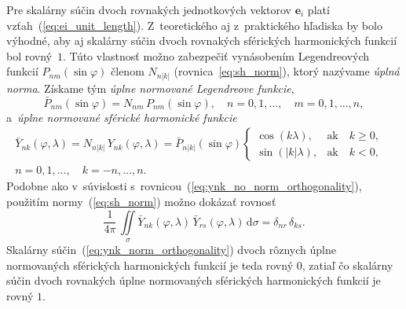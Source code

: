 \documentclass[a4paper,12pt]{book}
\newcommand{\diff}{\mathrm d}
\let\vec\mathbf
\begin{document}
Pre skalárny súčin dvoch rovnakých jednotkových vektorov $\vec e_i$ platí 
vzťah~(\ref{eq:ei_unit_length}).  Z~teoretického aj z~praktického hľadiska by 
bolo výhodné, aby aj skalárny súčin dvoch rovnakých sférických harmonických 
funkcií bol rovný~$1$.  Túto vlastnosť možno zabezpečiť vynásobením 
Legendreových funkcií $P_{nm}(\sin\varphi)$ členom $N_{n|k|}$ 
(rovnica~\ref{eq:sh_norm}), ktorý nazývame \emph{úplná norma}.  Získame tým 
\emph{úplne normované Legendreove funkcie},
%
\begin{equation}
\bar{P}_{nm}(\sin\varphi) = N_{nm} \, P_{nm}(\sin\varphi){,} \quad  n = 0, 1, 
\dots,
\quad m = 0, 1, \dots, n{,}
\end{equation}
%
a~\emph{úplne normované sférické harmonické funkcie}
%
\begin{equation}
\label{eq:ynk_norm}
\begin{split}
\bar{Y}_{nk}(\varphi, \lambda) = N_{n|k|} \, Y_{nk}(\varphi, \lambda)
= \bar{P}_{n|k|}(\sin\varphi)
%
\begin{cases}
\cos(k\lambda){,}    &\text{ak} \quad k \geq 0{,}\\
\sin(|k|\lambda){,}  &\text{ak} \quad k < 0{,}
\end{cases}
&
%
\\
n = 0, 1, \dots, \quad k = -n, \dots, n{.}&
\end{split}
\end{equation}
%
Podobne ako v~súvislosti s~rovnicou~(\ref{eq:ynk_no_norm_orthogonality}), 
použitím normy~(\ref{eq:sh_norm}) možno dokázať rovnosť
%
\begin{equation}
\label{eq:ynk_norm_orthogonality}
\frac{1}{4\pi} \, \iint\limits_{\sigma} \bar{Y}_{nk}(\varphi, \lambda) \,
\bar{Y}_{rs}(\varphi, \lambda) \, \diff \sigma = \delta_{nr} \, \delta_{ks}{.}
\end{equation}
%
Skalárny súčin~(\ref{eq:ynk_norm_orthogonality}) dvoch rôznych úplne
normovaných sférických harmonických funkcií je teda rovný 0, zatiaľ čo skalárny
súčin dvoch rovnakých úplne normovaných sférických harmonických funkcií je
rovný $1$.
\end{document}

